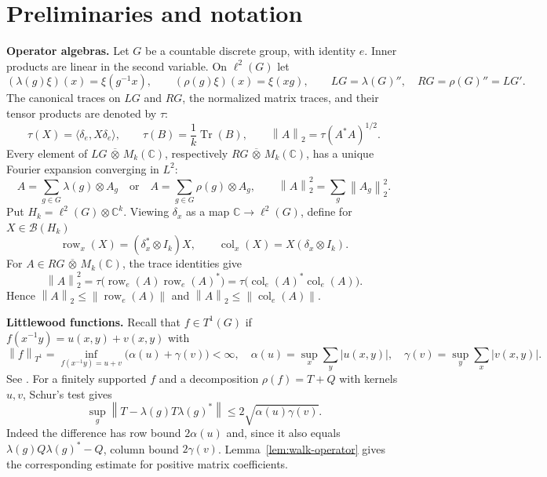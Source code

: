 \documentclass[a4paper,11pt]{amsproc}
\numberwithin{equation}{section}
\theoremstyle{definition}
\newcommand{\C}{\mathbb C}
\newcommand{\cB}{\mathcal B}
\newcommand{\norm}[1]{\left\lVert#1\right\rVert}
\DeclareMathOperator{\Tr}{Tr}
\DeclareMathOperator{\row}{row}
\DeclareMathOperator{\col}{col}
\begin{document}
\section{Preliminaries and notation}
\noindent\textbf{Operator algebras.} Let $G$ be a countable discrete group, with identity $e$. Inner products are linear in the second variable. On $\ell^2(G)$ let
\begin{equation}\label{eq:regular}
 (\lambda(g)\xi)(x)=\xi(g^{-1}x),\qquad
 (\rho(g)\xi)(x)=\xi(xg),\qquad
 LG=\lambda(G)'',\quad RG=\rho(G)''=LG'.
\end{equation}
The canonical traces on $LG$ and $RG$, the normalized matrix traces, and their tensor products are denoted by $\tau$:
\begin{equation}\label{eq:traces}
 \tau(X)=\langle\delta_e,X\delta_e\rangle,\qquad
 \tau(B)=\frac1k\Tr(B),\qquad
 \norm{A}_2=\tau(A^*A)^{1/2}.
\end{equation}
Every element of $LG\,\overline\otimes\,M_k(\C)$, respectively $RG\,\overline\otimes\,M_k(\C)$, has a unique Fourier expansion converging in $L^2$:
\begin{equation}\label{eq:fourier}
 A=\sum_{g\in G}\lambda(g)\otimes A_g
 \quad\text{or}\quad
 A=\sum_{g\in G}\rho(g)\otimes A_g,
 \qquad \norm{A}_2^2=\sum_g\norm{A_g}_2^2.
\end{equation}
Put $H_k=\ell^2(G)\otimes\C^k$. Viewing $\delta_x$ as a map $\C\to\ell^2(G)$, define for $X\in\cB(H_k)$
\begin{equation}\label{eq:row-column}
 \row_x(X)=(\delta_x^*\otimes I_k)X,\qquad
 \col_x(X)=X(\delta_x\otimes I_k).
\end{equation}
For $A\in RG\,\overline\otimes\,M_k(\C)$, the trace identities give
\begin{equation}\label{eq:trace-row-column}
 \norm{A}_2^2
 =\tau\bigl(\row_e(A)\row_e(A)^*\bigr)
 =\tau\bigl(\col_e(A)^*\col_e(A)\bigr).
\end{equation}
Hence $\norm{A}_2\le\norm{\row_e(A)}$ and $\norm{A}_2\le\norm{\col_e(A)}$.

\noindent\textbf{Littlewood functions.} Recall that $f\in T^1(G)$ if $f(x^{-1}y)=u(x,y)+v(x,y)$ with
\begin{equation}\label{eq:littlewood-norm}
 \norm{f}_{T^1}
 =\inf_{f(x^{-1}y)=u+v}\bigl(\alpha(u)+\gamma(v)\bigr)<\infty,
 \quad
 \alpha(u)=\sup_x\sum_y|u(x,y)|,\quad
 \gamma(v)=\sup_y\sum_x|v(x,y)|.
\end{equation}
See \cite[Definition 2.3 and Propositions 2.5--2.6]{ggmt}.
For a finitely supported $f$ and a decomposition $\rho(f)=T+Q$ with kernels $u,v$, Schur's test gives
\begin{equation}\label{eq:schur}
 \sup_g\norm{T-\lambda(g)T\lambda(g)^*}
 \le2\sqrt{\alpha(u)\gamma(v)}.
\end{equation}
Indeed the difference has row bound $2\alpha(u)$ and, since it also equals $\lambda(g)Q\lambda(g)^*-Q$, column bound $2\gamma(v)$. Lemma~\ref{lem:walk-operator} gives the corresponding estimate for positive matrix coefficients.
\end{document}
